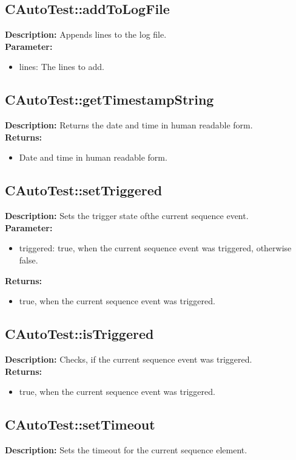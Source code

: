 \subsection{CAutoTest::addToLogFile}
\textbf{Description:} Appends lines to the log file.\\
\textbf{Parameter:}
\begin{itemize}
\item lines: The lines to add.
\end{itemize}

\subsection{CAutoTest::getTimestampString}
\textbf{Description:} Returns the date and time in human readable form.\\
\textbf{Returns:}
\begin{itemize}
\item Date and time in human readable form.
\end{itemize}

\subsection{CAutoTest::setTriggered}
\textbf{Description:} Sets the trigger state ofthe current sequence event.\\
\textbf{Parameter:}
\begin{itemize}
\item triggered: true, when the current sequence event was triggered, otherwise false.
\end{itemize}
\textbf{Returns:}
\begin{itemize}
\item true, when the current sequence event was triggered.
\end{itemize}

\subsection{CAutoTest::isTriggered}
\textbf{Description:} Checks, if the current sequence event was triggered.\\
\textbf{Returns:}
\begin{itemize}
\item true, when the current sequence event was triggered.
\end{itemize}

\subsection{CAutoTest::setTimeout}
\textbf{Description:} Sets the timeout for the current sequence element.\\

